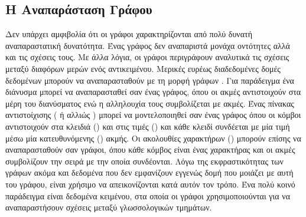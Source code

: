 \subsection{H Αναπαράσταση Γράφου}
Δεν υπάρχει αμφιβολία ότι οι γράφοι χαρακτηρίζονται από πολύ δυνατή αναπαραστατική δυνατότητα.
Ένας γράφος δεν αναπαριστά μονάχα οντότητες αλλά και τις σχέσεις τους.
Με άλλα λόγια, οι γράφοι περιγράφουν αναλυτικά τις σχέσεις μεταξύ διαφόρων μερών ενός αντικειμένου. 
Μερικές ευρέως διαδεδομένες δομές δεδομένων μπορούν να αναπαρασταθούν με τη μορφή γράφων \cite{borgwardt2007}. 
Για παράδειγμα ένα διάνυσμα μπορεί να αναπαρασταθεί σαν ένας γράφος, όπου οι ακμές αντιστοιχούν στα μέρη του διανύσματος ενώ η αλληλουχία τους συμβολίζεται με ακμές.
Ένας πίνακας αντιστοίχισης ( ή αλλιώς ) μπορεί να μοντελοποιηθεί σαν ένας γράφος όπου οι κόμβοι αντιστοιχούν στα κλειδιά () και στις τιμές () και κάθε κλειδί συνδέεται με μία τιμή μέσω μία κατευθυνόμενης () ακμής. 
Οι ακολουθίες χαρακτήρων () μπορούν επίσης να αναπαρασταθούν σαν γράφοι, όπου κάθε κόμβος είναι ένας χαρακτήρας και οι ακμές συμβολίζουν την σειρά με την οποία συνδέονται. 
Λόγω της εκφραστικότητας των γράφων ακόμα και δεδομένα που δεν εμφανίζουν εγγενώς δομή που μοιάζει με αυτή του γράφου, είναι χρήσιμο να απεικονίζονται κατά αυτόν τον τρόπο.
Ένα πολύ κοινό παράδειγμα είναι δεδομένα κειμένου, στα οποία οι γράφοι χρησιμοποιούνται για να αναπαραστήσουν σχέσεις μεταξύ γλωσσολογικών τμημάτων.
